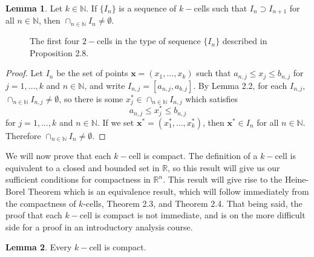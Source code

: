 \documentclass{article}
\newcommand{\N}{\mathbb{N}}
\newcommand{\R}{\mathbb{R}}
\newcommand{\x}{\mathbf{x}}
\theoremstyle{definition}
\newtheorem{lemma}{Lemma}[section]
\begin{document}
	\begin{lemma}
		Let $ k\in\N $. If $ \{I_n\} $ is a sequence of $ k- $cells such that $ I_n\supset I_{n+1} $ for all $ n\in\N $, then $ \cap_{n\in\N} I_n\neq\emptyset $. 
	\end{lemma}
	\begin{figure}[h]
		\centering
		\caption{The first four $ 2- $cells in the type of sequence $ \{I_n\} $ described in Proposition 2.8.}
	\end{figure}
	\begin{proof}
		Let $ I_n $ be the set of points $ \x=(x_1,\ldots,x_k) $ such that $ a_{n,j}\le x_j\le b_{n,j} $ for $ j=1,\ldots, k $ and $ n\in\N $, and write $ I_{n,j}=[a_{n,j},a_{b,j}] $. By Lemma 2.2, for each $ I_{n,j} $, $ \cap_{n\in\N}I_{n,j}\neq\emptyset $, so there is some $ x_j^*\in\cap_{n\in\N} I_{n,j} $ which satisfies $$ a_{n,j}\le x_j^*\le b_{n,j}$$ for $j=1,\ldots, k $ and $ n\in\N $. If we set $ \x^*=(x_1^*,\ldots,x_k^*) $, then $ \x^*\in I_n $ for all $ n\in\N $. Therefore  $ \cap_{n\in\N} I_n\neq\emptyset $. 
	\end{proof}
	We will now prove that each $ k -$cell is compact. The definition of a $ k -$cell is equivalent to a closed and bounded set in $ \R $, so this result will give us our sufficient conditions for compactness in $ \R^n $. This result will give rise to the Heine-Borel Theorem which is an equivalence result, which will follow immediately from the compactness of $ k $-cells, Theorem 2.3, and Theorem 2.4. That being said, the proof that each $ k -$cell is compact is not immediate, and is on the more difficult side for a proof in an introductory analysis course.    
	\begin{lemma}
		Every $ k -$cell is compact. 
	\end{lemma}
\end{document}

